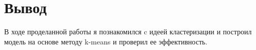 \chapter{Вывод}
\label{ch:chap3}

В ходе проделанной работы я познакомился c идеей кластеризации и построил модель на основе методу k-means и проверил ее эффективность.




\endinput